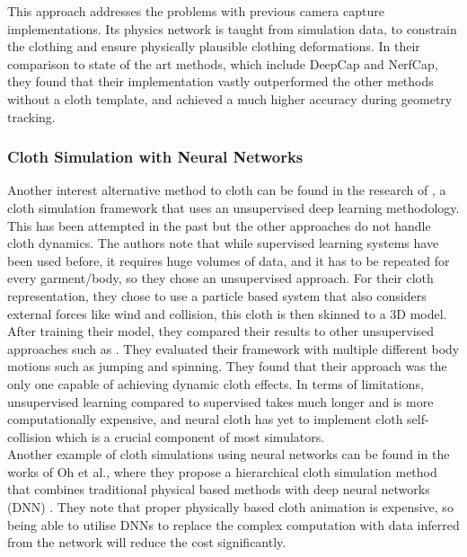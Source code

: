 \documentclass[12pt,a4paper]{article}
\begin{document}
This approach addresses the problems with previous camera capture implementations. Its physics network is taught from simulation data, to constrain the clothing and ensure physically plausible clothing deformations.
In their comparison to state of the art methods, which include DeepCap and NerfCap, they found that their implementation vastly outperformed the other methods without a cloth template, and achieved a much higher accuracy during geometry tracking.


\subsubsection{Cloth Simulation with Neural Networks}
\label{neuralSection}
Another interest alternative method to cloth can be found in the research of \cite{neuralCloth}, a cloth simulation framework that uses an unsupervised deep learning methodology. This has been attempted in the past but the other approaches do not handle cloth dynamics. The authors note that while supervised learning systems have been used before, it requires huge volumes of data, and it has to be repeated for every garment/body, so they chose an unsupervised approach. For their cloth representation, they chose to use a particle based system that also considers external forces like wind and collision, this cloth is then skinned to a 3D model. After training their model, they compared their results to other unsupervised approaches such as \cite{bertiche2021pbns}. They evaluated their framework with multiple different body motions such as jumping and spinning. They found that their approach was the only one capable of achieving dynamic cloth effects. In terms of limitations, unsupervised learning compared to supervised takes much longer and is more computationally expensive, and neural cloth has yet to implement cloth self-collision which is a crucial component of most simulators.
\\

Another example of cloth simulations using neural networks can be found in the works of Oh et al., where they propose a hierarchical cloth simulation method that combines traditional physical based methods with deep neural networks (DNN) \cite{OhNeural}. They note that proper physically based cloth animation is expensive, so being able to utilise DNNs to replace the complex computation with data inferred from the network will reduce the cost significantly.
\end{document}
